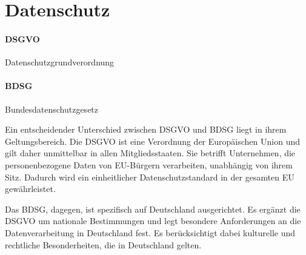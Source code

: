 \section{Datenschutz}
\label{sec:Datenschutz}



\paragraph{DSGVO} Datenschutzgrundverordnung

\paragraph{BDSG} Bundesdatenschutzgesetz


\begin{center}
\end{center}


Ein entscheidender Unterschied zwischen DSGVO und BDSG liegt in ihrem Geltungsbereich. Die DSGVO ist eine Verordnung der Europäischen Union und gilt daher unmittelbar in allen Mitgliedsstaaten. Sie betrifft Unternehmen, die personenbezogene Daten von EU-Bürgern verarbeiten, unabhängig von ihrem Sitz. Dadurch wird ein einheitlicher Datenschutzstandard in der gesamten EU gewährleistet.

Das BDSG, dagegen, ist spezifisch auf Deutschland ausgerichtet. Es ergänzt die DSGVO um nationale Bestimmungen und legt besondere Anforderungen an die Datenverarbeitung in Deutschland fest. Es berücksichtigt dabei kulturelle und rechtliche Besonderheiten, die in Deutschland gelten.




